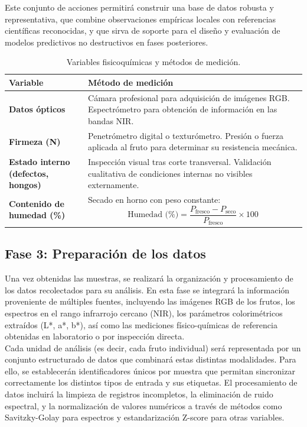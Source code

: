 Este conjunto de acciones permitirá construir una base de datos robusta y representativa, que combine observaciones empíricas locales con referencias científicas reconocidas, y que sirva de soporte para el diseño y evaluación de modelos predictivos no destructivos en fases posteriores.

\begin{table}[h]
\centering
\begin{tabular}{|p{4.5cm}|p{9cm}|}
\hline
\textbf{Variable} & \textbf{Método de medición} \\
\hline

\textbf{Datos ópticos} &
Cámara profesional para adquisición de imágenes RGB. Espectrómetro para obtención de información en las bandas NIR. \\
\hline

\textbf{Firmeza (N)} &
Penetrómetro digital o texturómetro. Presión o fuerza aplicada al fruto para determinar su resistencia mecánica. \\
\hline

\textbf{Estado interno (defectos, hongos)} &
Inspección visual tras corte transversal. Validación cualitativa de condiciones internas no visibles externamente. \\
\hline

\textbf{Contenido de humedad (\%)} &
Secado en horno con peso constante:
\[
\text{Humedad (\%)} = \frac{P_{\text{fresco}} - P_{\text{seco}}}{P_{\text{fresco}}} \times 100
\]
\\
\hline

\end{tabular}
\caption{Variables fisicoquímicas y métodos de medición.}
\label{tab:metodos}
\end{table}

\subsection{Fase 3: Preparación de los datos}

Una vez obtenidas las muestras, se realizará la organización y procesamiento de los datos recolectados para su análisis. En esta fase se integrará la información proveniente de múltiples fuentes, incluyendo las imágenes RGB de los frutos, los espectros en el rango infrarrojo cercano (NIR), los parámetros colorimétricos extraídos (L*, a*, b*), así como las mediciones físico-químicas de referencia obtenidas en laboratorio o por inspección directa.\\

Cada unidad de análisis (es decir, cada fruto individual) será representada por un conjunto estructurado de datos que combinará estas distintas modalidades. Para ello, se establecerán identificadores únicos por muestra que permitan sincronizar correctamente los distintos tipos de entrada y sus etiquetas. El procesamiento de datos incluirá la limpieza de registros incompletos, la eliminación de ruido espectral, y la normalización de valores numéricos a través de métodos como Savitzky-Golay para espectros y estandarización Z-score para otras variables.\\

